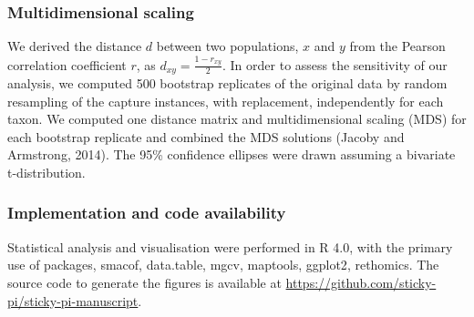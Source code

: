 \documentclass[fleqn,10pt]{wlscirep}
\begin{document}
\subsubsection*{Multidimensional scaling}

We derived the distance $d$ between two populations, $x$ and $y$ from the Pearson correlation coefficient $r$, as $d_{xy} = \frac{1 - r_{xy}}{2}$. In order to assess the sensitivity of our analysis, we computed 500 bootstrap replicates of the original data by random resampling of the capture instances, with replacement, independently for each taxon. We computed one distance matrix and multidimensional scaling (MDS) for each bootstrap replicate and combined the MDS solutions (Jacoby and Armstrong, 2014). The 95\% confidence ellipses were drawn assuming a bivariate t-distribution.

\subsubsection*{Implementation and code availability}

Statistical analysis and visualisation were performed in R 4.0\cite{r_core_team_r_2021}, with the primary use of packages, smacof\cite{leeuw_multidimensional_2009}, data.table\cite{dowle_datatable_2020}, mgcv\cite{wood_generalized_2017}, maptools\cite{bivand_maptools_2020}, ggplot2\cite{wickham_ggplot2_2016}, 
rethomics\cite{geissmann_rethomics_2019}. 
The source code to generate the figures is available at \href{https://github.com/sticky-pi/sticky-pi-manuscript}{https://github.com/sticky-pi/sticky-pi-manuscript}.

{

}


\end{document}
